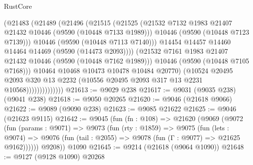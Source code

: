 \begin{lexlean}{RustCore}
\begin{coremodule}
                              (@21483
                                (@21489
                                  (@21496
                                    (@21515
                                      (@21525
                                        (@21532
                                          @7132
                                          @1983
                                          @21407
                                          @21432
                                          @10446
                                          (@9590 (@10448 @7133 @1989)))
                                        @10446
                                        (@9590 (@10448 @7123 @7139)))
                                      @10446
                                      (@9590 (@10448 @7113 @7140)))
                                    @14454
                                    @14457
                                    @14460
                                    @14464
                                    @14469
                                    (@9590 (@14473 @2093))))
                                (@21532
                                  @7161
                                  @1983
                                  @21407
                                  @21432
                                  @10446
                                  (@9590 (@10448 @7162 @1989)))
                                @10446
                                (@9590 (@10448 @7105 @7168)))
                              @10464
                              @10468
                              @10473
                              @10478
                              @10484
                              @20770)
                            (@10524
                              @20495
                              @2093
                              @320
                              @13
                              @2232
                              (@10556 @20495 @2093 @317 @13 @2231 @10568))))))))))))))
@21613 := @9029 @238
@21617 := @9031 (@9035 @238) (@9041 @238)
@21618 := @9050 @20265
@21620 := @9046 (@21618 @9066)
@21622 := @9089 (@9090 @238)
@21623 := @9085 @21622
@21625 := @9046 (@21623 @9115)
@21642 := @9045
    (fun (fn : @108) =>
    @21620
      (@9069
        (@9072
          (fun (params : @9071) =>
          @9073
            (fun (rty : @1859) =>
            @9075
              (fun (lets : @9074) =>
              @9076 (fun (tail : @2055) => @9078 (fun (Γ : @9077) => @21625 @9162))))))
        @9208))
    @1090
@21645 := @9214 (@21618 (@9064 @1090))
@21648 := @9127 (@9128 @1090) @20268

\end{coremodule}
\end{lexlean}

